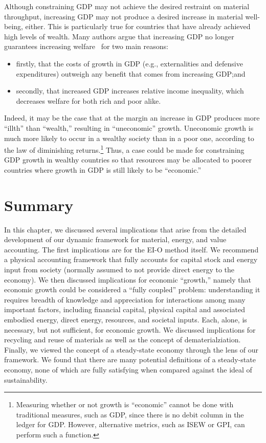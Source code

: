 Although constraining GDP may not achieve the desired restraint on material throughput,
increasing GDP may not produce a desired increase 
in material well-being, either. 
This is particularly 
true for countries that have already achieved high levels of wealth.  
Many authors argue that increasing GDP
no longer guarantees increasing welfare~\cite{G-R1975a, Wackernagel1996,
Cobb1999, Daly2006, Costanza2014} 
for two main reasons:
%
\begin{itemize}
	\item firstly, that the costs of growth in GDP (e.g., externalities 
           and defensive expenditures) outweigh any benefit 
	that comes from increasing GDP;\@ and
	
	\item secondly, that increased GDP 
	increases relative income inequality,
	which decreases welfare for both rich and poor 
	alike.\cite{Daly2006}
\end{itemize}

Indeed, it may be the case that at the margin an increase 
in GDP produces more ``illth'' than ``wealth,'' 
resulting
in ``uneconomic'' growth.\cite[p. 42]{Daly2006} 
Uneconomic growth is much more likely 
to occur in a wealthy society than in a poor one, 
according to the law of diminishing returns.\footnote{Measuring
whether or not growth is ``economic'' cannot be done 
with traditional measures, such as GDP, since there is no
debit column in the ledger for GDP\@.
However, alternative metrics, such as ISEW or GPI, can perform such a function.}
Thus, a case could be made for constraining GDP growth in wealthy countries 
so that resources may be allocated to poorer countries
where growth in GDP is still likely to be ``economic.''~\cite{Daly2006}


\section{Summary}
\label{sec:summary_implications}

In this chapter, we discussed several implications that arise from 
the detailed development of our dynamic framework for material,
energy, and value accounting.
The first implications are for the EI-O method itself. 
We recommend a physical accounting framework that fully
accounts for capital stock and energy input from society 
(normally assumed to not provide direct energy to the economy).
We then discussed implications for economic ``growth,''
namely that economic growth could be considered a ``fully coupled'' problem: 
understanding it requires breadth of knowledge 
and appreciation for interactions among many important factors,
including financial capital, physical capital and associated embodied energy,
direct energy, resources, and societal inputs.
Each, alone, is necessary, but not sufficient, for economic growth.
We discussed implications for recycling and reuse of materials
as well as the concept of dematerialziation.
Finally, we viewed the concept of a steady-state economy through
the lens of our framework.
We found that there are many potential definitions 
of a steady-state economy,
none of which are fully satisfying when compared against the ideal 
of sustainability.


